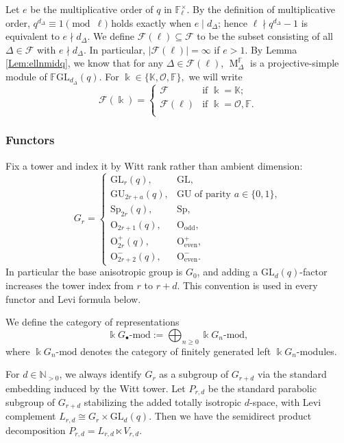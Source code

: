 \documentclass[12pt]{amsart}
\numberwithin{itemcounter}{subsection}
\theoremstyle{plain}
\theoremstyle{definition}
\theoremstyle{remark}
\numberwithin{equation}{section}
\def\bbF{\mathbb{F}}
\def\bbK{\mathbb{K}}
\def\bbN{\mathbb{N}}
\def\k{\Bbbk}
\def\calF{\mathcal{F}}
\def\calO{\mathcal{O}}
\def\O{\mathrm{O}}
\def\Sp{\mathrm{Sp}}
\def\GL{\mathrm{GL}}
\def\GU{\mathrm{GU}}
\def\M{{\operatorname{M}\nolimits}}
\begin{document}
Let $e$ be the multiplicative order of $q$ in \(\bbF_\ell^\times\). By the definition of multiplicative order, $q^{d_\Delta}\equiv1\pmod\ell$ holds exactly when $e\mid d_\Delta$; hence $\ell\nmid q^{d_\Delta}-1$ is equivalent to $e\nmid d_\Delta$.
We define \(\calF(\ell) \subseteq \calF\) to be the subset consisting of all \(\Delta \in \calF\) with $e\nmid d_\Delta$. In particular, $|\calF(\ell)|=\infty$ if $e>1.$
By Lemma \ref{Lem:ellnmidq}, we know that for any $\Delta\in \calF(\ell)$, $\M^\bbF_{\Delta}$ is a projective-simple module of $\bbF\GL_{d_\Delta}(q).$
For $\k\in\{\bbK,\calO,\bbF\},$
we will write
$$\calF(\k)=\begin{cases}
    \calF&\text{if $\k=\bbK;$}\\
    \calF(\ell)&\text{if $\k=\calO,\bbF.$}\\
\end{cases}$$
\subsubsection{Functors}
Fix a tower and index it by Witt rank rather than ambient dimension:
\[
G_r=\begin{cases}
\GL_r(q),&\GL,\\
\GU_{2r+a}(q),&\GU\text{ of parity }a\in\{0,1\},\\
\Sp_{2r}(q),&\Sp,\\
\O_{2r+1}(q),&\O_{\mathrm{odd}},\\
\O^+_{2r}(q),&\O^+_{\mathrm{even}},\\
\O^-_{2r+2}(q),&\O^-_{\mathrm{even}}.
\end{cases}
\]
In particular the base anisotropic group is \(G_0\), and adding a
\(\GL_d(q)\)-factor increases the tower index from \(r\) to \(r+d\).
This convention is used in every functor and Levi formula below.

We define the category of representations
\[
\k G_\bullet\text{-mod} := \bigoplus_{n \geq 0} \k G_n\text{-mod},
\]
where \(\k G_n\text{-mod}\) denotes the category of finitely generated left \(\k G_n\)-modules.

For \(d \in \bbN_{>0}\), we always identify \(G_r\) as a subgroup of \(G_{r+d}\) via the standard embedding induced by the Witt tower. Let \(P_{r,d}\) be the standard parabolic subgroup of \(G_{r+d}\) stabilizing the added totally isotropic \(d\)-space, with Levi complement \(L_{r,d} \cong G_r \times \GL_d(q)\). Then we have the semidirect product decomposition \(P_{r,d} = L_{r,d} \ltimes V_{r,d}\).
\end{document}
